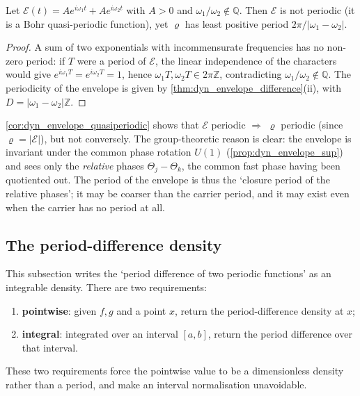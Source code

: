 \begin{corollary}\label{cor:dyn_envelope_quasiperiodic}
Let $\mathcal E(t)=Ae^{i\omega_1t}+Ae^{i\omega_2t}$ with $A>0$ and $\omega_1/\omega_2\notin\mathbb Q$. Then $\mathcal E$ is not periodic (it is a Bohr quasi-periodic function), yet $\varrho$ has least positive period $2\pi/|\omega_1-\omega_2|$.
\end{corollary}

\begin{proof}
A sum of two exponentials with incommensurate frequencies has no non-zero period: if $T$ were a period of $\mathcal E$, the linear independence of the characters would give $e^{i\omega_1T}=e^{i\omega_2T}=1$, hence $\omega_1T,\omega_2T\in2\pi\mathbb Z$, contradicting $\omega_1/\omega_2\notin\mathbb Q$. The periodicity of the envelope is given by \cref{thm:dyn_envelope_difference}(ii), with $D=|\omega_1-\omega_2|\mathbb Z$.
\end{proof}

\begin{remark}\label{rem:dyn_envelope_weaker}
\cref{cor:dyn_envelope_quasiperiodic} shows that $\mathcal E$ periodic $\Rightarrow$ $\varrho$ periodic (since $\varrho=|\mathcal E|$), but not conversely. The group-theoretic reason is clear: the envelope is invariant under the common phase rotation $U(1)$ (\cref{prop:dyn_envelope_sup}) and sees only the \emph{relative} phases $\Theta_j-\Theta_k$, the common fast phase having been quotiented out. The period of the envelope is thus the `closure period of the relative phases'; it may be coarser than the carrier period, and it may exist even when the carrier has no period at all.
\end{remark}

\subsection{The period-difference density}
\label{subsec:dyn_period_difference_density}

This subsection writes the `period difference of two periodic functions' as an integrable density. There are two requirements:
\begin{enumerate}[label=(\roman*)]
    \item \textbf{pointwise}: given \(f,g\) and a point \(x\), return the period-difference density at \(x\);
    \item \textbf{integral}: integrated over an interval \([a,b]\), return the period difference over that interval.
\end{enumerate}
These two requirements force the pointwise value to be a dimensionless density rather than a period, and make an interval normalisation unavoidable.

